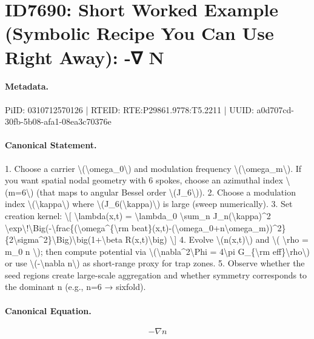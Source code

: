 \section*{ID7690: Short Worked Example (Symbolic Recipe You Can Use Right Away): -∇ N}
\paragraph{Metadata.}
PiID: 0310712570126 | RTEID: RTE:P29861.9778:T5.2211 | UUID: a0d707cd-30fb-5b08-afa1-08ea3c70376e

\paragraph{Canonical Statement.}
1. Choose a carrier \textbackslash{}(\textbackslash{}omega\_0\textbackslash{}) and modulation frequency \textbackslash{}(\textbackslash{}omega\_m\textbackslash{}). If you want spatial nodal geometry with 6 spokes, choose an azimuthal index \textbackslash{}(m=6\textbackslash{}) (that maps to angular Bessel order \textbackslash{}(J\_6\textbackslash{})). 2. Choose a modulation index \textbackslash{}(\textbackslash{}kappa\textbackslash{}) where \textbackslash{}(J\_6(\textbackslash{}kappa)\textbackslash{}) is large (sweep numerically). 3. Set creation kernel: \textbackslash{}[ \textbackslash{}lambda(x,t) = \textbackslash{}lambda\_0 \textbackslash{}sum\_n J\_n(\textbackslash{}kappa)\textasciicircum{}2 \textbackslash{}exp\textbackslash{}!\textbackslash{}Big(-\textbackslash{}frac\{(\textbackslash{}omega\textasciicircum{}\{\textbackslash{}rm beat\}(x,t)-(\textbackslash{}omega\_0+n\textbackslash{}omega\_m))\textasciicircum{}2\}\{2\textbackslash{}sigma\textasciicircum{}2\}\textbackslash{}Big)\textbackslash{}big(1+\textbackslash{}beta R(x,t)\textbackslash{}big) \textbackslash{}] 4. Evolve \textbackslash{}(n(x,t)\textbackslash{}) and \textbackslash{}( \textbackslash{}rho = m\_0 n \textbackslash{}); then compute potential via \textbackslash{}(\textbackslash{}nabla\textasciicircum{}2\textbackslash{}Phi = 4\textbackslash{}pi G\_\{\textbackslash{}rm eff\}\textbackslash{}rho\textbackslash{}) or use \textbackslash{}(-\textbackslash{}nabla n\textbackslash{}) as short-range proxy for trap zones. 5. Observe whether the seed regions create large-scale aggregation and whether symmetry corresponds to the dominant n (e.g., n=6 → sixfold).

\paragraph{Canonical Equation.}
\[
-\nabla n
\]

